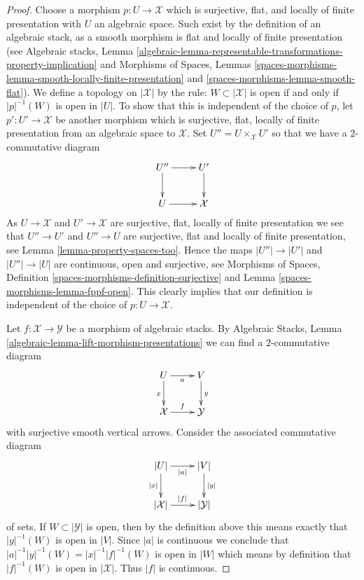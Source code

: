 \begin{proof}
Choose a morphism $p : U \to \mathcal{X}$ which is
surjective, flat, and locally of finite presentation
with $U$ an algebraic space. Such exist by the definition of an algebraic
stack, as a smooth morphism is flat and locally of finite presentation
(see
Algebraic stacks,
Lemma \ref{algebraic-lemma-representable-transformations-property-implication}
and
Morphisms of Spaces,
Lemmas \ref{spaces-morphisms-lemma-smooth-locally-finite-presentation} and
\ref{spaces-morphisms-lemma-smooth-flat}).
We define a topology on $|\mathcal{X}|$ by the rule:
$W \subset |\mathcal{X}|$ is open if and only if $|p|^{-1}(W)$ is open
in $|U|$. To show that this is independent of the choice of $p$, let
$p' : U' \to \mathcal{X}$ be another morphism which is surjective, flat,
locally of finite presentation from an algebraic space to
$\mathcal{X}$. Set $U'' = U \times_{\mathcal{X}} U'$
so that we have a $2$-commutative diagram
$$
\xymatrix{
U'' \ar[r] \ar[d] & U' \ar[d] \\
U \ar[r] & \mathcal{X}
}
$$
As $U \to \mathcal{X}$ and $U' \to \mathcal{X}$ are surjective, flat,
locally of finite presentation we see that $U'' \to U'$ and $U'' \to U$
are surjective, flat and locally of finite presentation, see
Lemma \ref{lemma-property-spaces-too}.
Hence the maps $|U''| \to |U'|$ and $|U''| \to |U|$ are continuous, open
and surjective, see
Morphisms of Spaces,
Definition \ref{spaces-morphisms-definition-surjective} and
Lemma \ref{spaces-morphisms-lemma-fppf-open}.
This clearly implies that our definition is independent of the choice
of $p : U \to \mathcal{X}$.

\medskip\noindent
Let $f : \mathcal{X} \to \mathcal{Y}$ be a morphism of algebraic stacks.
By
Algebraic Stacks, Lemma \ref{algebraic-lemma-lift-morphism-presentations}
we can find a $2$-commutative diagram
$$
\xymatrix{
U \ar[d]_x \ar[r]_a & V \ar[d]^y \\
\mathcal{X} \ar[r]^f & \mathcal{Y}
}
$$
with surjective smooth vertical arrows.
Consider the associated commutative diagram
$$
\xymatrix{
|U| \ar[d]_{|x|} \ar[r]_{|a|} & |V| \ar[d]^{|y|} \\
|\mathcal{X}| \ar[r]^{|f|} & |\mathcal{Y}|
}
$$
of sets. If $W \subset |\mathcal{Y}|$ is open, then by the definition
above this means exactly that $|y|^{-1}(W)$ is open in $|V|$. Since
$|a|$ is continuous we conclude that
$|a|^{-1}|y|^{-1}(W) = |x|^{-1}|f|^{-1}(W)$ is open in $|W|$ which means
by definition that $|f|^{-1}(W)$ is open in $|\mathcal{X}|$.
Thus $|f|$ is continuous.


\end{proof}
